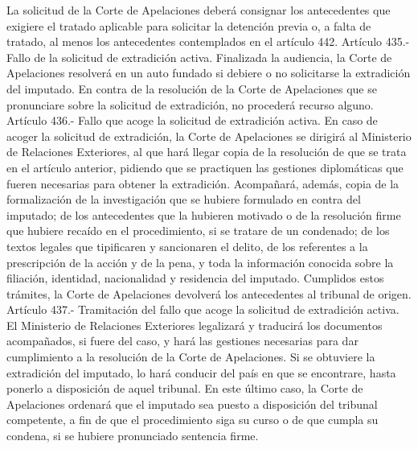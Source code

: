     La solicitud de la Corte de Apelaciones deberá consignar los antecedentes que exigiere el tratado aplicable para solicitar la detención previa o, a falta de tratado, al menos los antecedentes contemplados en el artículo 442.
    Artículo 435.- Fallo de la solicitud de extradición activa. Finalizada la audiencia, la Corte de Apelaciones resolverá en un auto fundado si debiere o no solicitarse la extradición del imputado.
    En contra de la resolución de la Corte de Apelaciones que se pronunciare sobre la solicitud de extradición, no procederá recurso alguno.
    Artículo 436.- Fallo que acoge la solicitud de extradición activa. En caso de acoger la solicitud de extradición, la Corte de Apelaciones se dirigirá al Ministerio de Relaciones Exteriores, al que hará llegar copia de la resolución de que se trata en el artículo anterior, pidiendo que se practiquen las gestiones diplomáticas que fueren necesarias para obtener la extradición.
    Acompañará, además, copia de la formalización de la investigación que se hubiere formulado en contra del imputado; de los antecedentes que la hubieren motivado o de la resolución firme que hubiere recaído en el procedimiento, si se tratare de un condenado; de los textos legales que tipificaren y sancionaren el delito, de los referentes a la prescripción de la acción y de la pena, y toda la información conocida sobre la filiación, identidad, nacionalidad y residencia del imputado.
    Cumplidos estos trámites, la Corte de Apelaciones devolverá los antecedentes al tribunal de origen.
    Artículo 437.- Tramitación del fallo que acoge la solicitud de extradición activa. El Ministerio de Relaciones Exteriores legalizará y traducirá los documentos acompañados, si fuere del caso, y hará las gestiones necesarias para dar cumplimiento a la resolución de la Corte de Apelaciones. Si se obtuviere la extradición del imputado, lo hará conducir del país en que se encontrare, hasta ponerlo a disposición de aquel tribunal.
    En este último caso, la Corte de Apelaciones ordenará que el imputado sea puesto a disposición del tribunal competente, a fin de que el procedimiento siga su curso o de que cumpla su condena, si se hubiere pronunciado sentencia firme.

